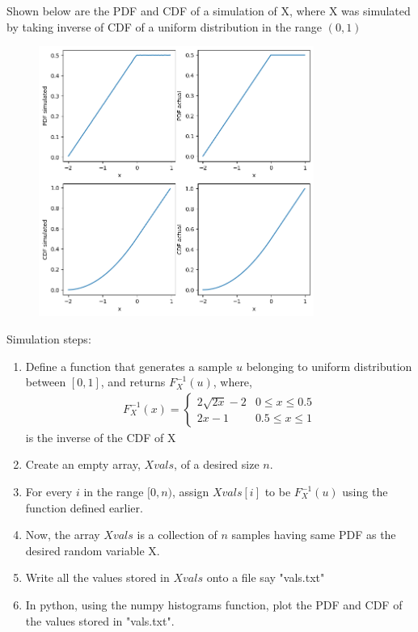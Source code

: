 \documentclass[]{article}
\begin{document}
Shown below are the PDF and CDF of a simulation of X, where X was simulated by taking inverse of CDF of a uniform distribution in the range $(0, 1)$
\begin{figure}[h]
    \centering
    \includegraphics[width=9cm]{./figs/z.png}
    \caption{}
    \label{fig:64ec/2022}
\end{figure}

Simulation steps:
\begin{enumerate}
    \item Define a function that generates a sample $u$ belonging to uniform distribution between $[0,1]$, and returns $F_X^{-1}(u)$, where, 
        \begin{align}
            F_X^{-1}(x)=	
			\begin{cases}
				2\sqrt{2x}-2 & 0\leq x \leq 0.5\\
				2x-1 & 0.5\leq x \leq 1
			\end{cases}	
        \end{align}
        is the inverse of the CDF of X
    \item Create an empty array, $Xvals$, of a desired size $n$.
    \item For every $i$ in the range $[0, n)$, assign $Xvals[i]$ to be $F_X^{-1}(u)$ using the function defined earlier.
    \item Now, the array $Xvals$ is a collection of $n$ samples having same PDF as the desired random variable X.
    \item Write all the values stored in $Xvals$ onto a file say "vals.txt" 
    \item In python, using the numpy histograms function, plot the PDF and CDF of the values stored in "vals.txt".
\end{enumerate}
\end{document}

